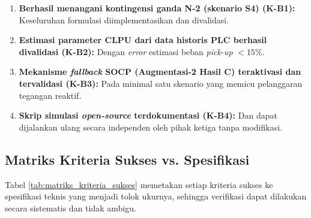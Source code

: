 \begin{enumerate}
    \item[a.] \textbf{Berhasil menangani kontingensi ganda N-2 (skenario S4) (K-B1):} Keseluruhan formulasi diimplementasikan dan divalidasi.
    \item[b.] \textbf{Estimasi parameter CLPU dari data historis PLC berhasil divalidasi (K-B2):} Dengan \textit{error} estimasi beban \textit{pick-up} $< 15\%$.
    \item[c.] \textbf{Mekanisme \textit{fallback} SOCP (Augmentasi-2 Hasil C) teraktivasi dan tervalidasi (K-B3):} Pada minimal satu skenario yang memicu pelanggaran tegangan reaktif.
    \item[d.] \textbf{Skrip simulasi \textit{open-source} terdokumentasi (K-B4):} Dan dapat dijalankan ulang secara independen oleh pihak ketiga tanpa modifikasi.
\end{enumerate}

\subsection{Matriks Kriteria Sukses vs. Spesifikasi}
\label{subsec:Matriks_Kriteria_Sukses}

Tabel \ref{tab:matriks_kriteria_sukses} memetakan setiap kriteria sukses ke spesifikasi teknis yang menjadi tolok ukurnya, sehingga verifikasi dapat dilakukan secara sistematis dan tidak ambigu.

